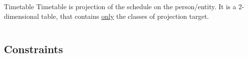 \documentclass{beamer}
\providecommand{\rootdir}{../doc}
\begin{document}
\begin{frame} %
  \begin{block}{Timetable}
    Timetable is projection of the schedule on the person/entity.
    It is a 2-dimensional table, that contains \underline{only} the classes
    of projection target.
  \end{block}
  \begin{columns}
    \begin{column}{.5\textwidth}
      \centering
      
    \end{column}
    \begin{column}{.5\textwidth}
      \centering
      
    \end{column}
  \end{columns}
\end{frame}

\subsection{Constraints}
\end{document}
